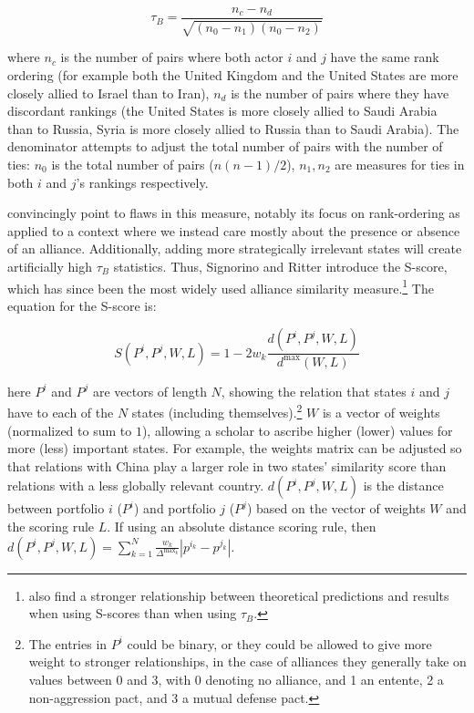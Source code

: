 \documentclass[12pt,pdflatex]{elsarticle}
\begin{document}
 \begin{equation}
	 \tau_{B} = \frac{n_{c} - n_{d}}{\sqrt{(n_{0} - n_{1})(n_{0} - n_{2})}}
 \end{equation}

 \noindent where $n_{c}$ is the number of pairs where both actor $i$ and $j$ have the same rank ordering (for example both the United Kingdom and the United States are more closely allied to Israel than to Iran), $n_{d}$ is the number of pairs where they have discordant rankings (the United States is more closely allied to Saudi Arabia than to Russia, Syria is more closely allied to Russia than to Saudi Arabia). The denominator attempts to adjust the total number of pairs with the number of ties: $n_{0}$ is the total number of pairs ($n(n-1)/2$), $n_{1}, n_{2}$ are measures for ties in both $i$ and $j$'s rankings respectively.

\citet{signorino:ritter:1999} convincingly point to flaws in this measure, notably its focus on rank-ordering as applied to a context where we instead care mostly about the presence or absence of an alliance. Additionally, adding more strategically irrelevant states will create artificially high $\tau_{B}$ statistics. Thus, Signorino and Ritter introduce the S-score, which has since been the most widely used alliance similarity measure.\footnote{\citet{bennett:rupert:2003} also find a stronger relationship between theoretical predictions and results when using S-scores than when using $\tau_{B}$.} The equation for the S-score is:

\begin{equation}
	S(P^i, P^j, W, L) = 1 - 2w_k \frac{d(P^i, P^j, W, L)}{d^{\text{max}}(W,L)}
\end{equation}

\noindent here $P^{i}$ and $P^{j}$ are vectors of length $N$, showing the relation that states $i$ and $j$ have to each of the $N$ states (including themselves).\footnote{The entries in $P^{i}$ could be binary, or they could be allowed to give more weight to stronger relationships, in the case of alliances they generally take on values between 0 and 3, with 0 denoting no alliance, and 1 an entente, 2 a non-aggression pact, and 3 a mutual defense pact.} $W$ is a vector of weights (normalized to sum to $1$), allowing a scholar to ascribe higher (lower) values for more (less) important states. For example, the weights matrix can be adjusted so that relations with China play a larger role in two states' similarity score than relations with a less globally relevant country. $d(P^i, P^j, W, L)$ is the distance between portfolio $i$ ($P^i$) and portfolio $j$ ($P^j$) based on the vector of weights $W$ and the scoring rule $L$. If using an absolute distance scoring rule, then $d(P^{i}, P^{j}, W, L) = \sum_{k = 1}^{N} \frac{w_{k}}{\Delta^{\text{max}_{k}}} |p^{i_{k}} - p^{j_{k}}|$.
\end{document}
